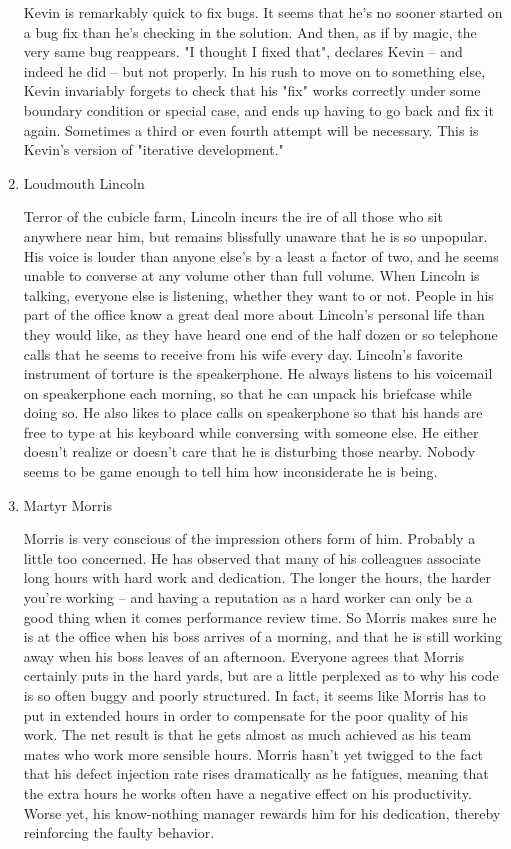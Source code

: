 \documentclass{article}
\begin{document}
\begin{enumerate}
Kevin is remarkably quick to fix bugs. It seems that he's no sooner
started on a bug fix than he's checking in the solution. And then, as if
by magic, the very same bug reappears. "I thought I fixed that",
declares Kevin -- and indeed he did -- but not properly. In his rush to
move on to something else, Kevin invariably forgets to check that his
"fix" works correctly under some boundary condition or special case, and
ends up having to go back and fix it again. Sometimes a third or even
fourth attempt will be necessary. This is Kevin's version of "iterative
development."

\item Loudmouth Lincoln
\label{sec:orgheadline15}

Terror of the cubicle farm, Lincoln incurs the ire of all those who sit
anywhere near him, but remains blissfully unaware that he is so
unpopular. His voice is louder than anyone else's by a least a factor of
two, and he seems unable to converse at any volume other than full
volume. When Lincoln is talking, everyone else is listening, whether
they want to or not. People in his part of the office know a great deal
more about Lincoln's personal life than they would like, as they have
heard one end of the half dozen or so telephone calls that he seems to
receive from his wife every day. Lincoln's favorite instrument of
torture is the speakerphone. He always listens to his voicemail on
speakerphone each morning, so that he can unpack his briefcase while
doing so. He also likes to place calls on speakerphone so that his hands
are free to type at his keyboard while conversing with someone else. He
either doesn't realize or doesn't care that he is disturbing those
nearby. Nobody seems to be game enough to tell him how inconsiderate he
is being.

\item Martyr Morris
\label{sec:orgheadline16}

Morris is very conscious of the impression others form of him. Probably
a little too concerned. He has observed that many of his colleagues
associate long hours with hard work and dedication. The longer the
hours, the harder you're working -- and having a reputation as a hard
worker can only be a good thing when it comes performance review time.
So Morris makes sure he is at the office when his boss arrives of a
morning, and that he is still working away when his boss leaves of an
afternoon. Everyone agrees that Morris certainly puts in the hard yards,
but are a little perplexed as to why his code is so often buggy and
poorly structured. In fact, it seems like Morris has to put in extended
hours in order to compensate for the poor quality of his work. The net
result is that he gets almost as much achieved as his team mates who
work more sensible hours. Morris hasn't yet twigged to the fact that his
defect injection rate rises dramatically as he fatigues, meaning that
the extra hours he works often have a negative effect on his
productivity. Worse yet, his know-nothing manager rewards him for his
dedication, thereby reinforcing the faulty behavior.


\end{enumerate}
\end{document}
